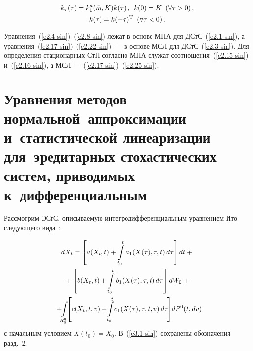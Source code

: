 \begin{multicols}{2}
\vspace*{-12pt}

\noindent
\begin{multline}
k_\tau (\tau) = k_1^a (\bar m, \bar K)k(\tau)\,,\enskip
k(0) =\bar K \enskip (\forall \tau >0)\,,\\
k(\tau) = k (-\tau)^{\mathrm{T}} \enskip (\forall \tau <0)\,.
\label{e2.25-sin}
\end{multline}

Уравнения~(\ref{e2.4-sin})--(\ref{e2.8-sin})
лежат в основе МНА для ДСтС~(\ref{e2.1-sin}), а уравнения~(\ref{e2.17-sin})--(\ref{e2.22-sin})~---
в основе МСЛ для ДСтС~(\ref{e2.3-sin}). Для определения стационарных СтП
согласно МНА служат соотношения~(\ref{e2.15-sin}) и~(\ref{e2.16-sin}),
а МСЛ~--- (\ref{e2.17-sin})--(\ref{e2.25-sin}).

\section{Уравнения методов нормальной~аппроксимации и~статистической линеаризации
для~эредитарных стохастических систем, приводимых к~дифференциальным}

Рассмотрим ЭСтС, описываемую интегродифференциальным уравнением Ито
следующего вида~\cite{7-sin}:

\noindent
\begin{multline}
dX_t = \lk a(X_t, t) +\iii_{t_0}^t a_1 (X(\tau) ,\tau, t)\,d\tau\rk dt+{}\\
{}+\lk b(X_t, t) +\iii_{t_0}^t b_1 (X(\tau) ,\tau, t)\,d\tau\rk dW_0+{}\\
\hspace*{-1.5mm}{}+\!\!\iii_{R_0^q}\!\!\lk c(X_t, t,v) +\!\iii_{t_0}^t\! c_1 (X(\tau) ,\tau, t,v)\,d\tau\!\rk\! dP^0 (t, dv)
\!\!\!\!\label{e3.1-sin}
\end{multline}
с начальным условием  $X(t_0) = X_0$. В~(\ref{e3.1-sin})
сохранены обозначения разд.~2.


\end{multicols}
